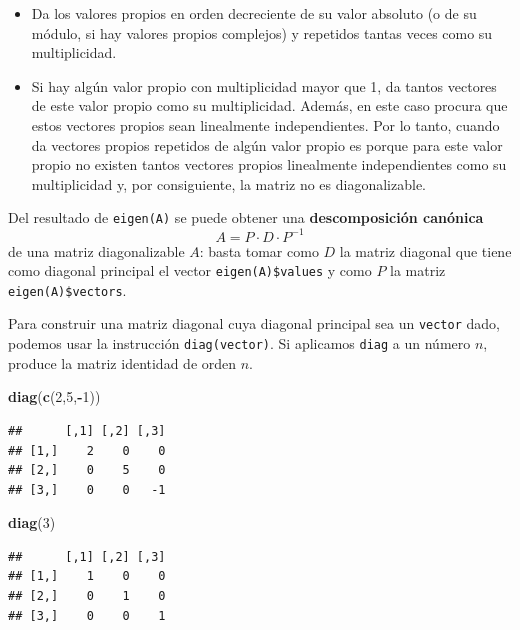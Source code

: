 \documentclass[]{book}
\newenvironment{Shaded}{\begin{snugshade}}{\end{snugshade}}
\newcommand{\DecValTok}[1]{\textcolor[rgb]{0.00,0.00,0.81}{#1}}
\newcommand{\KeywordTok}[1]{\textcolor[rgb]{0.13,0.29,0.53}{\textbf{#1}}}
\newcommand{\NormalTok}[1]{#1}
\newcommand{\OperatorTok}[1]{\textcolor[rgb]{0.81,0.36,0.00}{\textbf{#1}}}
\theoremstyle{definition}
\theoremstyle{definition}
\theoremstyle{definition}
\theoremstyle{remark}
\begin{document}
\begin{itemize}
\item
  Da los valores propios en orden decreciente de su valor absoluto (o de su módulo, si hay valores propios complejos) y repetidos tantas veces como su multiplicidad.
\item
  Si hay algún valor propio con multiplicidad mayor que 1, da tantos vectores de este valor propio como su multiplicidad. Además, en este caso procura que estos vectores propios sean linealmente independientes. Por lo tanto, cuando da vectores propios repetidos de algún valor propio es porque para este valor propio no existen tantos vectores propios linealmente independientes como su multiplicidad y, por consiguiente, la matriz no es diagonalizable.
\end{itemize}

Del resultado de \texttt{eigen(A)} se puede obtener una \textbf{descomposición canónica}
\[
A= P\cdot D\cdot P^{-1}
\]
de una matriz diagonalizable \(A\): basta tomar como \(D\) la matriz diagonal que tiene como diagonal principal el vector \texttt{eigen(A)\$values} y como \(P\) la matriz \texttt{eigen(A)\$vectors}.

Para construir una matriz diagonal cuya diagonal principal sea un \texttt{vector} dado, podemos usar la instrucción \texttt{diag(vector)}. Si aplicamos \texttt{diag} a un número \(n\), produce la matriz identidad de orden \(n\).

\begin{Shaded}
\begin{Highlighting}[]
\KeywordTok{diag}\NormalTok{(}\KeywordTok{c}\NormalTok{(}\DecValTok{2}\NormalTok{,}\DecValTok{5}\NormalTok{,}\OperatorTok{-}\DecValTok{1}\NormalTok{))}
\end{Highlighting}
\end{Shaded}

\begin{verbatim}
##      [,1] [,2] [,3]
## [1,]    2    0    0
## [2,]    0    5    0
## [3,]    0    0   -1
\end{verbatim}

\begin{Shaded}
\begin{Highlighting}[]
\KeywordTok{diag}\NormalTok{(}\DecValTok{3}\NormalTok{)}
\end{Highlighting}
\end{Shaded}

\begin{verbatim}
##      [,1] [,2] [,3]
## [1,]    1    0    0
## [2,]    0    1    0
## [3,]    0    0    1
\end{verbatim}
\end{document}
